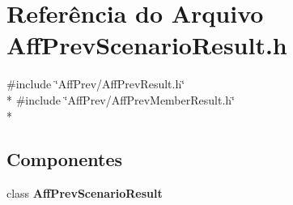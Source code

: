 \section{Referência do Arquivo Aff\+Prev\+Scenario\+Result.\+h}
\label{_aff_prev_scenario_result_8h}
{\ttfamily \#include \char`\"{}Aff\+Prev/\+Aff\+Prev\+Result.\+h\char`\"{}}\\*
{\ttfamily \#include \char`\"{}Aff\+Prev/\+Aff\+Prev\+Member\+Result.\+h\char`\"{}}\\*
\subsection*{Componentes}
\begin{DoxyCompactItemize}
\item 
class {\bf Aff\+Prev\+Scenario\+Result}
\end{DoxyCompactItemize}
